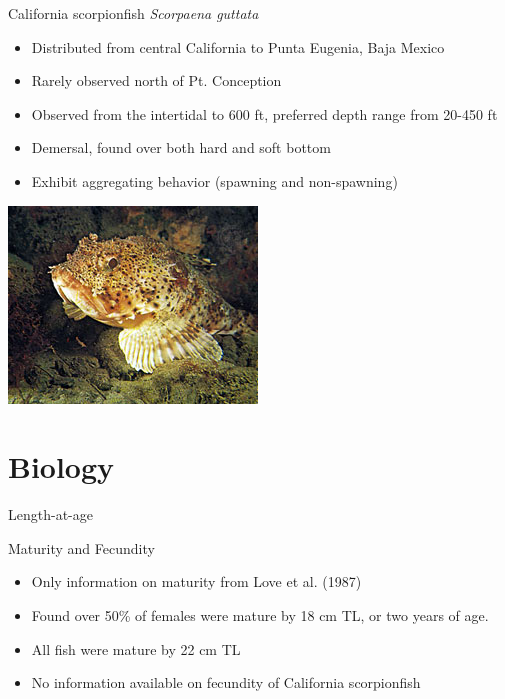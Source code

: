 \documentclass[ignorenonframetext,]{beamer}
\begin{document}
\begin{frame}{California scorpionfish \emph{Scorpaena guttata}}

\begin{itemize} 
 \item[\checkmark] Distributed from central California to Punta Eugenia, Baja Mexico  
 \item[\checkmark] Rarely observed north of Pt. Conception  
 \item[\checkmark] Observed from the intertidal to 600 ft,  preferred depth range from 20-450 ft  
 \item[\checkmark] Demersal, found over both hard and soft bottom  
 \item[\checkmark] Exhibit aggregating behavior (spawning and non-spawning)  
\end{itemize}

\includegraphics[width=.5\textwidth, inner]{cover_photo}

\end{frame}

\section{Biology}\label{biology}

\begin{frame}{Length-at-age}

\end{frame}

\begin{frame}{Maturity and Fecundity}

\begin{itemize}
\item
  Only information on maturity from Love et al. (1987)
\item
  Found over 50\% of females were mature by 18 cm TL, or two years of
  age.
\item
  All fish were mature by 22 cm TL
\item
  No information available on fecundity of California scorpionfish
\end{itemize}

\end{frame}
\end{document}
